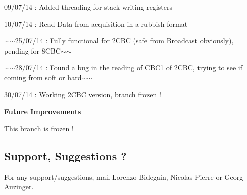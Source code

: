 \begin{DoxyItemize}
\item 09/07/14 \-: Added threading for stack writing registers
\item 10/07/14 \-: Read Data from acquisition in a rubbish format
\item $\sim$$\sim$25/07/14 \-: Fully functional for 2\-C\-B\-C (safe from Broadcast obviously), pending for 8\-C\-B\-C$\sim$$\sim$
\item $\sim$$\sim$28/07/14 \-: Found a bug in the reading of C\-B\-C1 of 2\-C\-B\-C, trying to see if coming from soft or hard$\sim$$\sim$
\item 30/07/14 \-: Working 2\-C\-B\-C version, branch frozen ! \par
 \par
 {\bfseries Future Improvements}
\item This branch is frozen !
\end{DoxyItemize}

\subsection*{Support, Suggestions ? }

For any support/suggestions, mail Lorenzo Bidegain, Nicolas Pierre or Georg Auzinger. 